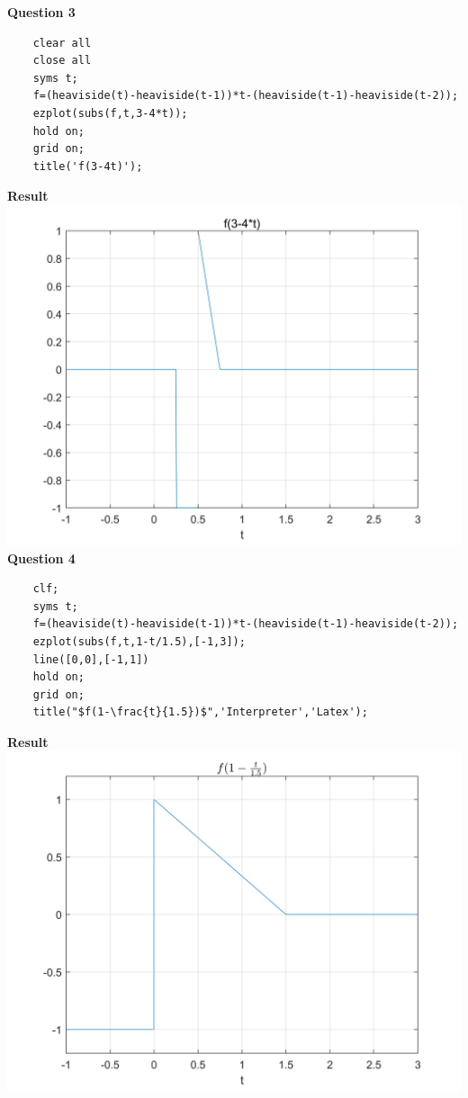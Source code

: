 \documentclass[UTF8,a4paper]{article}
\begin{document}
\textbf{Question 3}
\begin{lstlisting}
    clear all
    close all
    syms t;
    f=(heaviside(t)-heaviside(t-1))*t-(heaviside(t-1)-heaviside(t-2));
    ezplot(subs(f,t,3-4*t));
    hold on;
    grid on;
    title('f(3-4t)');
\end{lstlisting}
\textbf{Result}\\
\includegraphics[scale=0.65]{符号1-3.png}\\
\textbf{Question 4}\\
\begin{lstlisting}
    clf;
    syms t;
    f=(heaviside(t)-heaviside(t-1))*t-(heaviside(t-1)-heaviside(t-2));
    ezplot(subs(f,t,1-t/1.5),[-1,3]);
    line([0,0],[-1,1])
    hold on;
    grid on;
    title("$f(1-\frac{t}{1.5})$",'Interpreter','Latex');    
\end{lstlisting}
\textbf{Result}\\
\includegraphics[scale=0.6]{符号1-4.png}\\
\end{document}
